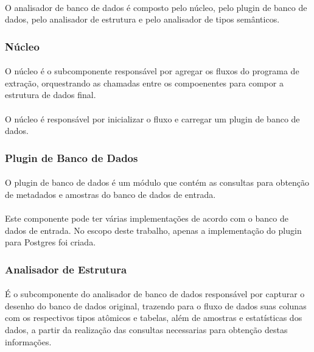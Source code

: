 \paragraph{} O analisador de banco de dados é composto pelo núcleo, pelo plugin de banco de dados, pelo analisador de estrutura e pelo analisador de tipos semânticos.

\subsubsection{Núcleo}

\paragraph{} O núcleo é o subcomponente responsável por agregar os fluxos do programa de extração, orquestrando as chamadas entre os compoenentes para compor a estrutura de dados final.

\paragraph{} O núcleo é responsável por inicializar o fluxo e carregar um plugin de banco de dados.

\subsubsection{Plugin de Banco de Dados}

\paragraph{} O plugin de banco de dados é um módulo que contém as consultas para obtenção de metadados e amostras do banco de dados de entrada.

\paragraph{} Este componente pode ter várias implementações de acordo com o banco de dados de entrada. No escopo deste trabalho, apenas a implementação do plugin para Postgres foi criada.

\subsubsection{Analisador de Estrutura}

\paragraph{} É o subcomponente do analisador de banco de dados responsável por capturar o desenho do banco de dados original, trazendo para o fluxo de dados suas colunas com os respectivos tipos atômicos e tabelas, além de amostras e estatísticas dos dados, a partir da realização das consultas necessarias para obtenção destas informações.


